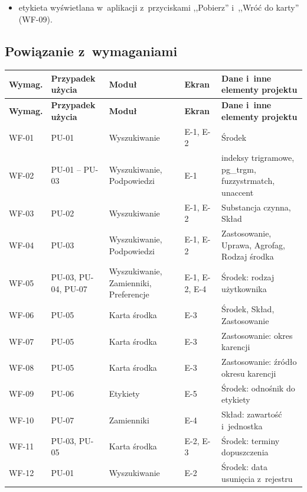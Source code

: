 \begin{itemize}
    \item etykieta wyświetlana w~aplikacji z~przyciskami ,,Pobierz''
    i~,,Wróć do karty'' (WF-09).
\end{itemize}

\subsection{Powiązanie z~wymaganiami}
\label{sec:powiazanie}

\begingroup
\small
\begin{longtable}{|p{1.7cm}|>{\raggedright\arraybackslash}p{2cm}|>{\raggedright\arraybackslash}p{3.3cm}|>{\raggedright\arraybackslash}p{1.6cm}|>{\raggedright\arraybackslash}p{5cm}|}
\hline
\textbf{Wymag.} & \textbf{Przypadek użycia} & \textbf{Moduł} & \textbf{Ekran} & \textbf{Dane i~inne elementy projektu} \\
\hline
\endfirsthead
\hline
\textbf{Wymag.} & \textbf{Przypadek użycia} & \textbf{Moduł} & \textbf{Ekran} & \textbf{Dane i~inne elementy projektu} \\
\hline
\endhead
WF-01 & PU-01 & Wyszukiwanie & E-1, E-2 & Środek \\
\hline
WF-02 & PU-01 -- PU-03 & Wyszukiwanie, Podpowiedzi & E-1 & indeksy trigramowe, pg\_trgm, fuzzystrmatch, unaccent \\
\hline
WF-03 & PU-02 & Wyszukiwanie & E-1, E-2 & Substancja czynna, Skład \\
\hline
WF-04 & PU-03 & Wyszukiwanie, Podpowiedzi & E-1, E-2 & Zastosowanie, Uprawa, Agrofag, Rodzaj środka \\
\hline
WF-05 & PU-03, PU-04, PU-07 & Wyszukiwanie, Zamienniki, Preferencje & E-1, E-2, E-4 & Środek: rodzaj użytkownika \\
\hline
WF-06 & PU-05 & Karta środka & E-3 & Środek, Skład, Zastosowanie \\
\hline
WF-07 & PU-05 & Karta środka & E-3 & Zastosowanie: okres karencji \\
\hline
WF-08 & PU-05 & Karta środka & E-3 & Zastosowanie: źródło okresu karencji \\
\hline
WF-09 & PU-06 & Etykiety & E-5 & Środek: odnośnik do etykiety \\
\hline
WF-10 & PU-07 & Zamienniki & E-4 & Skład: zawartość i~jednostka \\
\hline
WF-11 & PU-03, PU-05 & Karta środka & E-2, E-3 & Środek: terminy dopuszczenia \\
\hline
WF-12 & PU-01 & Wyszukiwanie & E-2 & Środek: data usunięcia z~rejestru \\

\end{longtable}

